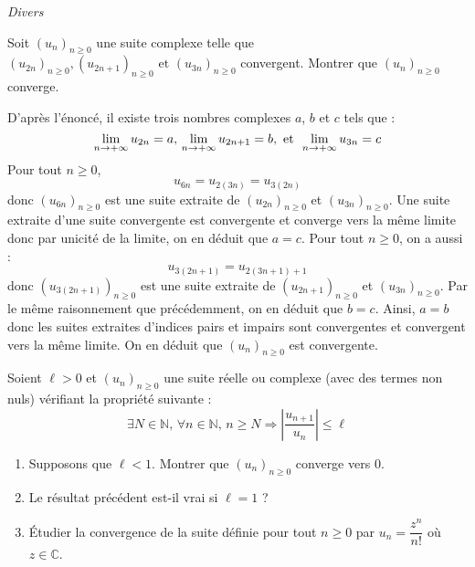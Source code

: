 \documentclass[a4paper,10pt]{report}
\begin{document}
\newpage

\begin{center}
\textit{{ {\large Divers}}}
\end{center}

\medskip

\begin{Exa} Soit $(u_n)_{n \geq 0}$ une suite complexe telle que $(u_{2n})_{n \geq 0},(u_{2n + 1})_{n \geq 0}{\text{ et }}(u_{3n})_{n \geq 0}$ convergent. Montrer que $(u_n)_{n \geq 0}$ converge.
\end{Exa} 

\corr D'après l'énoncé, il existe trois nombres complexes $a$, $b$ et $c$ tels que :
$$ \lim_{n \rightarrow + \infty} u_{2n} = a, \,  \lim_{n \rightarrow + \infty} u_{2n+1} = b,  \hbox{ et } \, \lim_{n \rightarrow + \infty} u_{3n} = c$$
Pour tout $n \geq 0$,
$$ u_{6n} = u_{2(3n)}=u_{3(2n)}$$
donc $(u_{6n})_{n \geq 0}$ est une suite extraite de $(u_{2n})_{n \geq 0}$ et $(u_{3n})_{n \geq 0}$. Une suite extraite d'une suite convergente est convergente et converge vers la même limite donc par unicité de la limite, on en déduit que $a=c$. Pour tout $n \geq 0$, on a aussi :
$$ u_{3(2n+1)}=u_{2(3n+1)+1}$$
donc $(u_{3(2n+1)})_{n \geq 0}$ est une suite extraite de $(u_{2n+1})_{n \geq 0}$ et $(u_{3n})_{n \geq 0}$. Par le même raisonnement que précédemment, on en déduit que $b=c$. Ainsi, $a=b$ donc les suites extraites d'indices pairs et impairs sont convergentes et convergent vers la même limite. On en déduit que $(u_n)_{n \geq 0}$ est convergente. 

\medskip


\begin{Exa} Soient $\ell>0$ et $(u_n)_{n \geq 0}$ une suite réelle ou complexe (avec des termes non nuls) vérifiant la propriété suivante :
$$\exists N \in \mathbb{N}, \, \forall n \in \mathbb{N}, \, n \geq N \Longrightarrow \left\vert \frac{u_{n+1}}{u_n} \right\vert   \leq \ell$$

\begin{enumerate}
\item Supposons que $\ell<1$. Montrer que $(u_n)_{n \geq 0}$ converge vers $0$.
\item Le résultat précédent est-il vrai si $\ell = 1$ ?
\item Étudier la convergence de la suite définie pour tout $n \geq 0$ par $u_n = \dfrac{z^n}{n!}$ où $z \in \mathbb{C}$.
\end{enumerate}
\end{Exa}

\corr 
\end{document}
